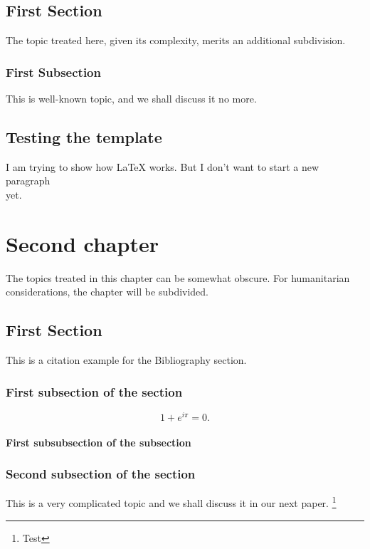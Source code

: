 \documentclass[phd]{pittetd}
\begin{document}
\section{First Section}
The topic treated here, given its complexity, merits an additional subdivision.


\subsection{First Subsection}
This is well-known topic, and we shall discuss it no more.
\section{Testing the template}
I am trying to show how LaTeX works.
But I don't want to start a new paragraph \\ yet.
\cite{DUMMY:1}


\chapter{Second chapter}
The topics treated in this chapter can be somewhat obscure.
For humanitarian considerations, the chapter will be subdivided.
\section{First Section}
This is a citation example for the Bibliography section.\cite{DUMMY:2}


\subsection{First subsection of the section}

\begin{equation} \label{EQ1}
     1 + e^{i \pi} = 0.
\end{equation}
\subsubsection{First subsubsection of the subsection}

\subsection{Second subsection of the section}
This is a very complicated topic and we shall discuss it in our next paper.\cite{DUMMY:11}
\footnote{Test}
\end{document}
